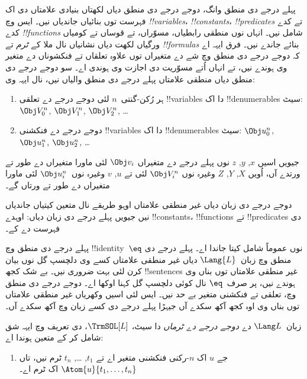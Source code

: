 \documentclass[../../../include/open-logic-section]{subfiles}
\begin{document}


پہلے درجے دی منطق وانگ، دوجے درجے دی منطق دیاں لکھتاں
بنیادی علامتاں دی اک فہرست توں بنائیاں جاندیاں نیں۔ ایس وچ
\emph{!!{variable}s}، \emph{!!{constant}s}،
\emph{!!{predicate}s} تے کدے کدے
\emph{!!{function}s} شامل نیں۔ انہاں نوں منطقی رابطیاں،
مسوّراں، تے قوساں تے کومیاں ورگیاں لکھت دیاں نشانیاں
نال ملا کے \emph{ٹرم} تے \emph{!!{formula}s}
بنائے جاندے نیں۔ فرق ایہہ اے کہ دوجے درجے دی منطق وچ
شے دے متغیراں توں علاوہ تعلقاں تے فنکشوناں دے
متغیر وی ہوندے نیں، تے انہاں اُتے مسوّریت دی
اجازت وی ہوندی اے۔ سو دوجے درجے دی منطق دیاں منطقی
علامتاں پہلے درجے دی منطق والیاں نیں، نال ایہہ وی:

\begin{enumerate}
\item ہر رُکن-گنتی~$n$ لئی دوجے درجے دے تعلقی !!{variable}s دا
  اک !!{denumerable}s سیٹ:
  $\Obj V_0^n$, $\Obj V_1^n$, $\Obj V_2^n$, \dots
\item دوجے درجے دے فنکشنی !!{variable}s دا اک
  !!{denumerable}s سیٹ:
  $\Obj u_0^n$, $\Obj u_1^n$, $\Obj u_2^n$, \dots
\end{enumerate}

جیویں اسیں $x$, $y$, $z$ نوں پہلے درجے دے
متغیراں $\Obj v_i$ لئی ماورا متغیراں دے طور تے ورتدے آں،
اُویں $X$, $Y$, $Z$ وغیرہ نوں $\Obj V_i^n$ لئی
تے $u$, $v$ وغیرہ نوں~$\Obj u_i^n$ لئی ماورا متغیراں
دے طور تے ورتاں گے۔

\begin{explain}
دوجے درجے دی زبان دیاں غیر منطقی علامتاں اوہو
طریقے نال متعین کیتیاں جاندیاں نیں جیویں پہلے درجے
دی زبان دیاں: اوہدے !!{constant}s، !!{function}s
تے !!{predicate}s دی فہرست دے کے۔

پہلے درجے دی منطق وچ !!{identity}~$\eq$ نوں عموماً
شامل کیتا جاندا اے۔ پہلے درجے دی منطق وچ
زبان~$\Lang{L}$ دیاں غیر منطقی علامتاں کسے وی
دلچسپ گل نوں بیان کرن لئی بہت ضروری نیں۔ بے شک
کجھ !!{sentence}s غیر منطقی علامتاں توں بناں وی
ہوندے نیں، پر صرف~$\eq$ نال کوئی دلچسپ گل کہنا
اوکھا اے۔ دوجے درجے دی منطق وچ، تعلقی تے فنکشنی متغیر بے حد نیں۔ ایس لئی اسیں
وکھریاں غیر منطقی علامتاں توں بناں وی اوہ کجھ آکھ سکدے آں
جیہڑا پہلے درجے دی کسے زبان وچ آکھ سکدے آں۔
\end{explain}

\begin{defn}
زبان~$\Lang L$ دے \emph{دوجے درجے دے ٹرماں} دا سیٹ،
$\TrmSOL[L]$، 
دی تعریف وچ ایہہ شق شامل کر کے متعین ہوندا اے:
\begin{enumerate}
\item جے $u$ اک $n$-رکنی فنکشنی متغیر اے تے $t_1$, \dots, $t_n$
  ٹرم نیں، تاں $\Atom{u}{t_1, \ldots, t_n}$ اک ٹرم اے۔
\end{enumerate}
\end{defn}
\end{document}
